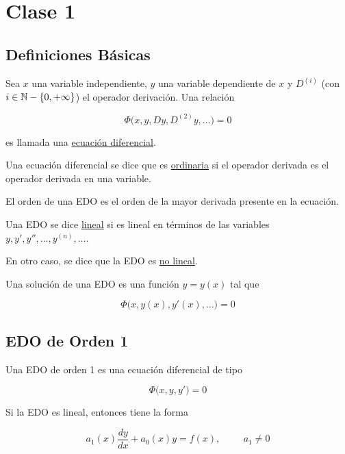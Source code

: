 \section*{Clase 1}

\subsection*{Definiciones Básicas}

\begin{defn}
    Sea $x$ una variable independiente, $y$ una variable dependiente de $x$ y $D^{(i)}$ (con $i \in \mathbb{N} - \{0, +\infty\}$) el operador derivación. Una relación
    
    \[
    \Phi\big( x, y, Dy, D^{(2)}y, \dots \big) = 0
    \]

    es llamada una \ul{ecuación diferencial}.

    Una ecuación diferencial se dice que es \ul{ordinaria} si el operador derivada es el operador derivada en una variable.
\end{defn}

\begin{defn}
    El orden de una EDO es el orden de la mayor derivada presente en la ecuación.
\end{defn}

\begin{defn}
    Una EDO se dice \ul{lineal} si es lineal en términos de las variables $y, y', y'', \dots, y^{(n)}, \dots$.

    En otro caso, se dice que la EDO es \ul{no lineal}.
\end{defn}

\begin{defn}
    Una solución de una EDO es una función $y = y(x)$ tal que

    \[
    \Phi\big( x, y(x), y'(x), \dots \big) = 0
    \]
\end{defn}

\subsection*{EDO de Orden 1}

\begin{defn}
    Una EDO de orden 1 es una ecuación diferencial de tipo

    \[
    \Phi\big( x, y, y' \big) = 0
    \]

    Si la EDO es lineal, entonces tiene la forma

    \[
    a_1(x)\frac{dy}{dx} + a_0(x)y = f(x), \hspace{1cm} a_1 \neq 0
    \]
\end{defn}

